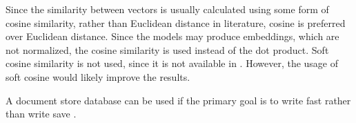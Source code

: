 Since the similarity between vectors is usually calculated using some form of cosine similarity, 
rather than Euclidean distance in literature, cosine is preferred over Euclidean distance. 
Since the models may produce embeddings, which are not normalized, the cosine similarity is used instead of the dot product.
Soft cosine similarity is not used, since it is not available in \databaseName{}.
However, the usage of soft cosine would likely improve the results.

A document store database can be used if the primary goal is to write fast rather than write save \cite{flask2018}.